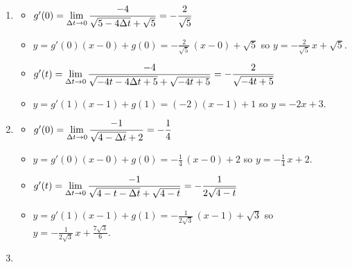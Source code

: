 \begin{enumerate}
\setcounter{enumi}{\value{HW}}

\item \begin{itemize}

\item  $g'(0) = \displaystyle{ \lim_{\Delta t \rightarrow 0} \dfrac{-4}{\sqrt{5-4\Delta t} + \sqrt{5}}  = - \dfrac{2}{\sqrt{5}}}$

\smallskip

\item  $y = g'(0) (x - 0) + g(0) =  -\frac{2}{\sqrt{5}} \, (x-0) + \sqrt{5}$ so $y = -\frac{2}{\sqrt{5}} \, x + \sqrt{5}$.

\smallskip

\item  $g'(t) =  \displaystyle{ \lim_{\Delta t \rightarrow 0} \dfrac{-4}{\sqrt{-4t-4\Delta t+5} + \sqrt{-4t+5}} =   -\dfrac{2}{\sqrt{-4t+5}}}$

\smallskip

\item  $y = g'(1)(x-1)+g(1) = (-2)(x-1) + 1$ so $y = -2x+3$.

\smallskip

\end{itemize}

\item   \begin{itemize}

\item  $g'(0) = \displaystyle{ \lim_{\Delta t \rightarrow 0} \dfrac{-1}{\sqrt{4-\Delta t} + 2}  = - \dfrac{1}{4}}$

\smallskip

\item  $y = g'(0) (x - 0) + g(0) =  -\frac{1}{4} \, (x-0) + 2$ so $y = -\frac{1}{4} \, x +2$.

\smallskip

\item  $g'(t) = \displaystyle{ \lim_{\Delta t \rightarrow 0} \dfrac{-1}{\sqrt{4-t-\Delta t} + \sqrt{4-t}} = -\dfrac{1}{2 \sqrt{4-t}} }$  

\smallskip

\item  $y = g'(1)(x-1)+g(1) = -\frac{1}{2 \sqrt{3}} \, (x-1) + \sqrt{3}$ so $y =  -\frac{1}{2 \sqrt{3}}  \, x + \frac{7 \sqrt{3}}{6}$.

\smallskip

\end{itemize}


\item   \begin{enumerate}


\end{enumerate}
\end{enumerate}
